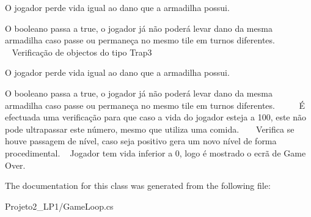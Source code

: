 O jogador perde vida igual ao dano que a armadilha possui.

O booleano passa a true, o jogador já não poderá levar dano da mesma armadilha caso passe ou permaneça no mesmo tile em turnos diferentes. ~\newline
~\newline
~\newline
~\newline
~\newline
~\newline
 Verificação de objectos do tipo Trap3

O jogador perde vida igual ao dano que a armadilha possui.

O booleano passa a true, o jogador já não poderá levar dano da mesma armadilha caso passe ou permaneça no mesmo tile em turnos diferentes. ~\newline
~\newline
~\newline
 É efectuada uma verificação para que caso a vida do jogador esteja a 100, este não pode ultrapassar este número, mesmo que utiliza uma comida. ~\newline
~\newline
 Verifica se houve passagem de nível, caso seja positivo gera um novo nível de forma procedimental. ~\newline
 Jogador tem vida inferior a 0, logo é mostrado o ecrã de Game Over. 

The documentation for this class was generated from the following file\+:\begin{DoxyCompactItemize}
\item 
Projeto2\+\_\+\+L\+P1/Game\+Loop.\+cs\end{DoxyCompactItemize}
